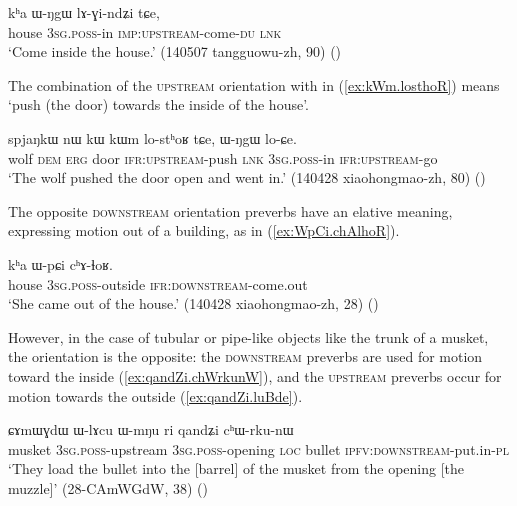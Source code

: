 \begin{exe}
\ex \label{ex:WNgW.lAGindZi}
\gll   kʰa ɯ-ŋgɯ lɤ-ɣi-ndʑi tɕe,   \\
  house  \textsc{3sg}.\textsc{poss}-in \textsc{imp}:\textsc{upstream}-come-\textsc{du} \textsc{lnk}   \\
\glt `Come inside the house.' (140507 tangguowu-zh, 90) ()
\end{exe}

The combination of the \textsc{upstream} orientation with  in (\ref{ex:kWm.losthoR}) means `push (the door) towards the inside of the house'.

\begin{exe}
\ex \label{ex:kWm.losthoR}
\gll spjaŋkɯ nɯ kɯ kɯm lo-stʰoʁ tɕe, ɯ-ŋgɯ lo-ɕe. \\
wolf \textsc{dem} \textsc{erg} door \textsc{ifr}:\textsc{upstream}-push \textsc{lnk} \textsc{3sg}.\textsc{poss}-in \textsc{ifr}:\textsc{upstream}-go \\
\glt `The wolf pushed the door open and went in.' (140428 xiaohongmao-zh, 80)
()
\end{exe}

The  opposite \textsc{downstream} orientation preverbs have an elative meaning, expressing motion out of a building, as in (\ref{ex:WpCi.chAlhoR}).

\begin{exe}
\ex \label{ex:WpCi.chAlhoR}
\gll  kʰa ɯ-pɕi cʰɤ-ɬoʁ. \\
house \textsc{3sg}.\textsc{poss}-outside \textsc{ifr}:\textsc{downstream}-come.out \\
\glt `She came out of the house.' (140428 xiaohongmao-zh, 28) 	()
\end{exe}

However, in the case of tubular or pipe-like objects like the trunk of a musket, the orientation is the opposite: the \textsc{downstream} preverbs are used for motion toward the inside (\ref{ex:qandZi.chWrkunW}), and the \textsc{upstream} preverbs occur for motion towards the outside (\ref{ex:qandZi.luBde}).

\begin{exe}
\ex \label{ex:qandZi.chWrkunW}
\gll  ɕɤmɯɣdɯ ɯ-lɤcu ɯ-mŋu ri qandʑi cʰɯ-rku-nɯ \\
musket \textsc{3sg}.\textsc{poss}-upstream \textsc{3sg}.\textsc{poss}-opening \textsc{loc} bullet \textsc{ipfv}:\textsc{downstream}-put.in-\textsc{pl} \\
\glt `They load the bullet into the [barrel] of the musket from the opening [the muzzle]' (28-CAmWGdW, 38) ()
\end{exe}

